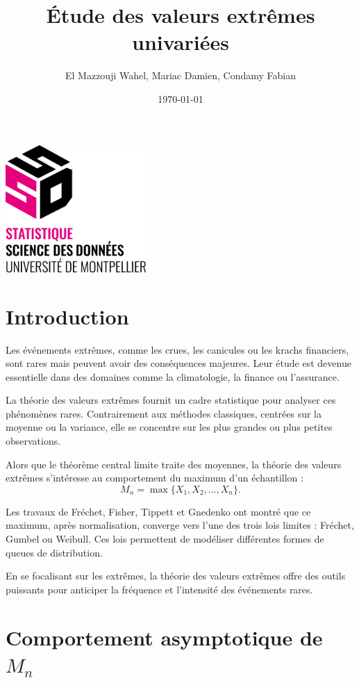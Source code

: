 \documentclass{article}
\title{\Huge \textbf{Étude des valeurs extrêmes univariées}}
\author{El Mazzouji Wahel, Mariac Damien, Condamy Fabian}
\date{\today}
\theoremstyle{plain}
\theoremstyle{definition}
\theoremstyle{plain}
\begin{document}
\maketitle 

\begin{center}
	\vspace{4cm} 
	\includegraphics[width=0.4\textwidth]{./images/LogoSSD.png} 
\end{center}

\newpage
\tableofcontents 
\newpage
\section{Introduction}
Les événements extrêmes, comme les crues, les canicules ou les krachs financiers, sont rares mais peuvent avoir des conséquences majeures. Leur étude est devenue essentielle dans des domaines comme la climatologie, la finance ou l’assurance.

La théorie des valeurs extrêmes fournit un cadre statistique pour analyser ces phénomènes rares. Contrairement aux méthodes classiques, centrées sur la moyenne ou la variance, elle se concentre sur les plus grandes ou plus petites observations.

Alors que le théorème central limite traite des moyennes, la théorie des valeurs extrêmes s’intéresse au comportement du maximum d’un échantillon :
\[
M_n = \max\{X_1, X_2, \dots, X_n\}.
\]

Les travaux de Fréchet, Fisher, Tippett et Gnedenko ont montré que ce maximum, après normalisation, converge vers l’une des trois lois limites : Fréchet, Gumbel ou Weibull. Ces lois permettent de modéliser différentes formes de queues de distribution.

En se focalisant sur les extrêmes, la théorie des valeurs extrêmes offre des outils puissants pour anticiper la fréquence et l’intensité des événements rares.
\section{Comportement asymptotique de $M_n$}
\end{document}
